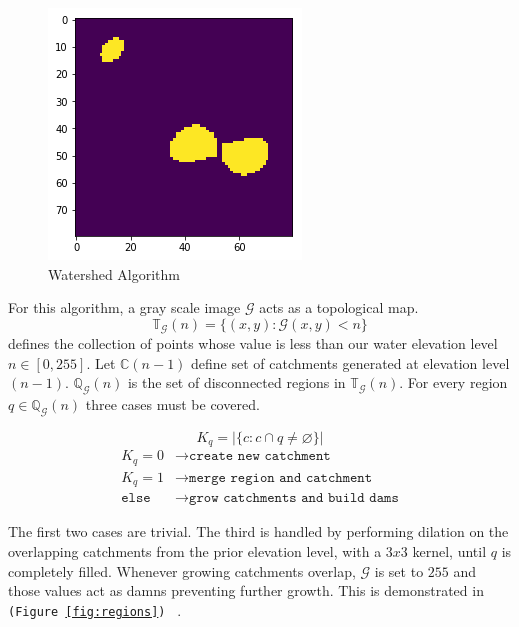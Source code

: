 \documentclass[11pt,twocolumn]{article} %
\begin{document}
\begin{figure}
\begin{multicols}{3}
    \includegraphics[width=\columnwidth]{./images/algorithm/split.png}
  \end{multicols}
        \caption{Watershed Algorithm}
        \label{fig:demo}
\end{figure}

For this algorithm, a gray scale image $\mathcal{G}$ acts as a topological map.
\[\mathbb{T}_\mathcal{G}(n) = \{(x,y) : \mathcal{G}(x,y) < n\}\]
defines the collection of points whose value is less than our water elevation level $n\in[0,255]$.
Let $\mathbb{C}(n-1)$ define set of catchments generated at elevation level $(n-1)$.
$\mathbb{Q}_\mathcal{G}(n)$ is the set of disconnected regions in $\mathbb{T}_\mathcal{G}(n)$.
For every region $q \in \mathbb{Q}_\mathcal{G}(n)$ three cases must be covered.

\[K_q = \big\vert\{c : c\cap q \neq \varnothing\}\big\vert\]
\begin{align*}
  K_q = 0  &\rightarrow\texttt{create new catchment}\\
  K_q = 1  &\rightarrow\texttt{merge region and catchment}\\
  \texttt{else}  &\rightarrow\texttt{grow catchments and build dams}
\end{align*}

The first two cases are trivial. The third is handled by performing dilation on the overlapping catchments from the prior elevation level, with a $3x3$ kernel, until $q$ is completely filled. Whenever growing catchments overlap, $\mathcal{G}$ is set to $255$ and those values act as damns preventing further growth. This is demonstrated in \texttt{(Figure~\ref{fig:regions})} ~\cite{dip}.
\end{document}
